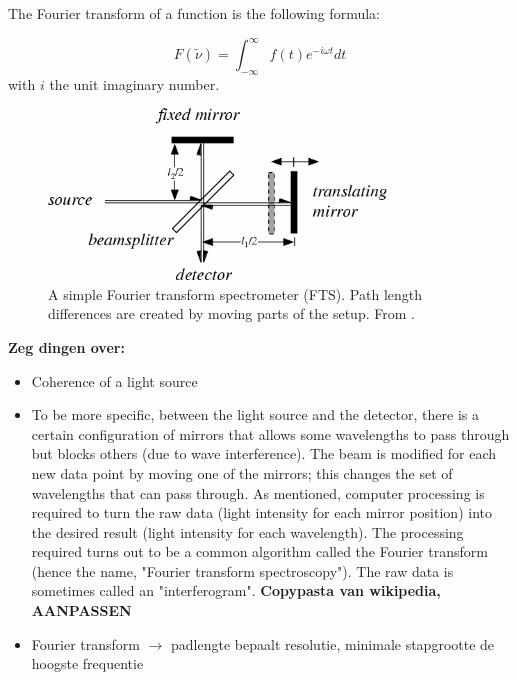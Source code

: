 The Fourier transform of a function is the following formula:

\[
 F(\tilde{\nu})=\int_{-\infty}^{\infty}f(t)e^{-i\omega t}dt
\]
with $i$ the unit imaginary number.

\begin{figure}
 \begin{center}
  \includegraphics[width=0.8\textwidth]{figures/fts.png}
  \caption{A simple Fourier transform spectrometer (FTS). Path length differences are created by moving parts of the setup.  From \cite{wolf}.}
  \label{fig:fts}
 \end{center}
\end{figure}

\textbf{Zeg dingen over:}
\begin{itemize}
 \item Coherence of a light source
 \item To be more specific, between the light source and the detector, there is a certain configuration of mirrors that allows some wavelengths to pass through but blocks others (due to wave interference). The beam is modified for each new data point by moving one of the mirrors; this changes the set of wavelengths that can pass through.
As mentioned, computer processing is required to turn the raw data (light intensity for each mirror position) into the desired result (light intensity for each wavelength). The processing required turns out to be a common algorithm called the Fourier transform (hence the name, "Fourier transform spectroscopy"). The raw data is sometimes called an "interferogram". \textbf{Copypasta van wikipedia, AANPASSEN}
 \item Fourier transform $\rightarrow$ padlengte bepaalt resolutie, minimale stapgrootte de hoogste frequentie

\end{itemize}



